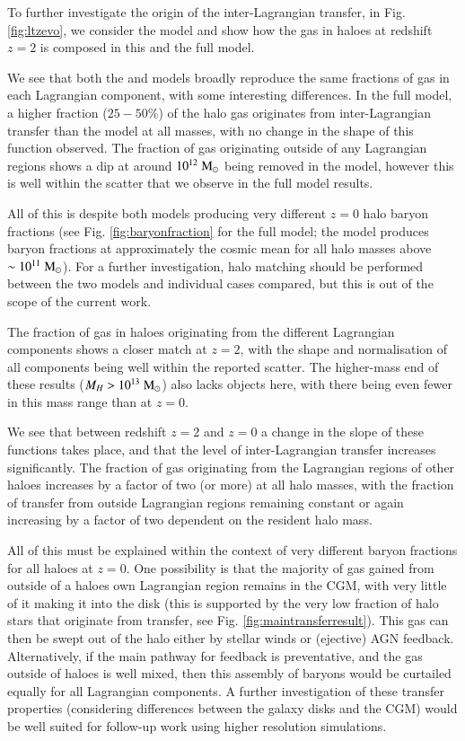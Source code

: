 To further investigate the origin of the inter-Lagrangian transfer, in Fig.
\ref{fig:ltzevo}, we consider the \nojet{} model and show how the gas in
haloes at redshift $z=2$ is composed in this and the full \simba{} model.

We see that both the \nojet{} and \simba{} models broadly reproduce the same
fractions of gas in each Lagrangian component, with some interesting differences.
In the full model, a higher fraction ($25-50\%$) of the halo gas originates
from inter-Lagrangian transfer than the \nojet{} model at all masses, with no
change in the shape of this function observed. The fraction of gas
originating outside of any Lagrangian regions shows a dip at around
$10^{12}\;{\rm M}_{\odot}{}$ being removed in the \nojet{} model, however this is well
within the scatter that we observe in the full model results.

All of this is despite both models producing very different $z=0$ halo baryon
fractions (see Fig. \ref{fig:baryonfraction} for the full model; the \nojet{}
model produces baryon fractions at approximately the cosmic mean for all halo
masses above $\sim10^{11}\;{\rm M}_{\odot}{}$). For a further investigation, halo matching
should be performed between the two models and individual cases compared, but
this is out of the scope of the current work.

The fraction of gas in haloes originating from the different Lagrangian
components shows a closer match at $z=2$, with the shape and
normalisation of all components being well within the reported scatter. The
higher-mass end of these results ($M_H > 10^{13}\;{\rm M}_{\odot}{}$) also lacks
objects here, with there being even fewer in this mass range than at $z=0$.

We see that between redshift $z=2$ and $z=0$ a change in the slope
of these functions takes place, and that the level of inter-Lagrangian transfer
increases significantly. The fraction of gas originating from the Lagrangian 
regions of other haloes increases by a factor of two (or more) at all halo
masses, with the fraction of transfer from outside Lagrangian regions remaining
constant or again increasing by a factor of two dependent on the resident halo mass.

All of this must be explained within the context of very different baryon
fractions for all haloes at $z=0$. One possibility is that the majority of
gas gained from outside of a haloes own Lagrangian region remains in the CGM,
with very little of it making it into the disk (this is supported by the very
low fraction of halo stars that originate from transfer, see Fig.
\ref{fig:maintransferresult}). This gas can then be swept out of the halo
either by stellar winds or (ejective) AGN feedback. Alternatively, if the
main pathway for feedback is preventative, and the gas outside of haloes is
well mixed, then this assembly of baryons would be curtailed equally for all
Lagrangian components. A further investigation of these transfer properties
(considering differences between the galaxy disks and the CGM) would be well
suited for follow-up work using higher resolution simulations.

